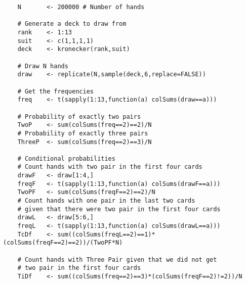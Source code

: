 \begin{exercise}
	\begin{verbatim}
	N       <- 200000 # Number of hands 		
	
	# Generate a deck to draw from
	rank    <- 1:13
	suit    <- c(1,1,1,1)
	deck    <- kronecker(rank,suit)
	
	# Draw N hands
	draw    <- replicate(N,sample(deck,6,replace=FALSE))
	
	# Get the frequencies
	freq    <- t(sapply(1:13,function(a) colSums(draw==a)))
	
	# Probability of exactly two pairs
	TwoP    <- sum(colSums(freq==2)==2)/N
	# Probability of exactly three pairs
	ThreeP  <- sum(colSums(freq==2)==3)/N
	
	# Conditional probabilities
	# Count hands with two pair in the first four cards
	drawF   <- draw[1:4,]
	freqF   <- t(sapply(1:13,function(a) colSums(drawF==a)))
	TwoPF   <- sum(colSums(freqF==2)==2)/N
	# Count hands with one pair in the last two cards 
	# given that there were two pair in the first four cards
	drawL   <- draw[5:6,]
	freqL   <- t(sapply(1:13,function(a) colSums(drawL==a)))
	TcDf    <- sum((colSums(freqL==2)==1)*(colSums(freqF==2)==2))/(TwoPF*N)
	
	# Count hands with Three Pair given that we did not get
	# two pair in the first four cards
	TiDf    <- sum((colSums(freq==2)==3)*(colSums(freqF==2)!=2))/N
	

\end{verbatim}
\end{exercise}
